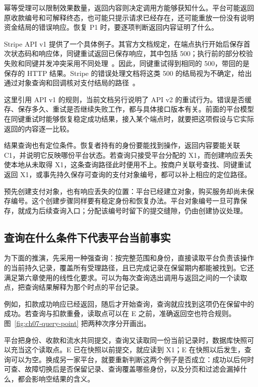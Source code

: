 幂等受理可以限制效果数量，返回内容则决定调用方能够获知什么。平台可能返回原收款编号和可解释终态，也可能只提示请求已经存在，还可能重放一份没有说明资金结局的错误响应。恢复 P1 时，要逐项判断返回内容证明了什么。

Stripe API v1 提供了一个具体例子。其官方文档规定，在端点执行开始后保存首次状态码和响应体，同键重试返回已保存响应，其中包括 500；执行前的部分校验失败和同键并发冲突采用不同处理~\cite{stripe-v1-idempotency}。因此，同键重试得到相同的 500，带回的是保存的 HTTP 结果。Stripe 的错误处理文档将这类 500 的结局视为不确定，给出通过对象查询和回调核对支付结局的路径~\cite{stripe-v1-idempotency}。

这里引用 API v1 的规则，当前文档另行说明了 API v2 的重试行为。错误是否缓存、保存多久、重试是否继续失败工作，都与具体接口版本有关。前面的平台模型在同键重试时能够恢复稳定成功结果，接入某个端点时，就要把这项假设与它实际返回的内容逐一比较。

结果查询也有定位条件。恢复者持有的身份要能找到操作，返回内容要能关联 C1，并说明它反映哪份平台状态。若查询只接受平台分配的 X1，而创建响应丢失使本地从未取得 X1，这条查询路径此时便用不上。按商户关联号查找、同键重试返回 X1，或事先持久保存可查询的支付对象编号，都可以补上相应的定位路径。

预先创建支付对象，也有响应丢失的位置：平台已经建立对象，购买服务却尚未保存编号。这个创建步骤同样要有稳定身份和恢复办法。平台对象编号一旦可靠保存，就成为后续查询入口；分配该编号时留下的提交缝隙，仍由创建协议处理。

\subsection*{查询在什么条件下代表平台当前事实}

为下面的推演，先采用一种强查询：按完整范围和身份，直接读取平台负责该操作的当前持久记录，覆盖所有受理路径，且已完成记录在保留期内都能被找到。它还满足第六章使用的线性化要求。可以为每次查询选出调用与返回之间的一个读取点，把查询结果解释为那个时点的平台记录。

例如，扣款成功响应已经返回，随后才开始查询，查询就应找到这项仍在保留中的成功。若查询与扣款重叠，读取点可以在 E 之前，准确返回空也符合规则。图~\ref{fig:ch07-query-point} 把两种次序分开画出。


平台把身份、收款和流水共同提交，查询又读取同一份当前记录时，数据库快照可以充当这个读取点。E 已在快照以前提交，就应读到 X1；E 在快照以后发生，查询可以为空。换成另一家平台，就要重新判断这两个例子是否成立：成功以后何时可查、故障切换后是否保留记录、查询覆盖哪些身份，以及分页和过滤会漏掉什么，都会影响空结果的含义。

